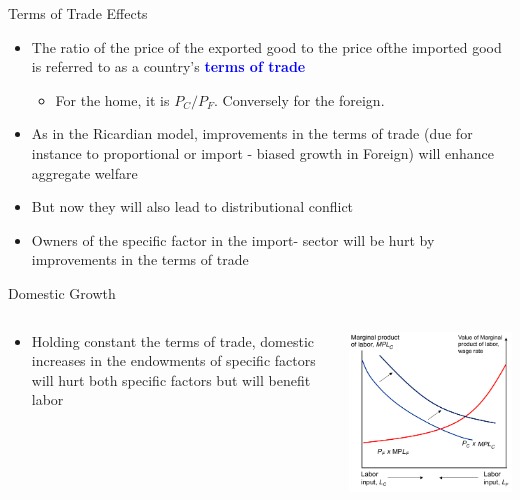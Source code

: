 \documentclass[10pt,hyperref={CJKbookmarks=true},xcolor=dvipsnames,aspectratio=169]{beamer}
\begin{document}
\begin{frame}{Terms of Trade Effects}

\begin{itemize}
\item The ratio of the price of the exported good to the price ofthe imported
good is referred to as a country's \textbf{\textcolor{blue}{terms
of trade}}

\begin{itemize}
\item For the home, it is $P_{C}/P_{F}$. Conversely for the foreign.
\end{itemize}
\item As in the Ricardian model, improvements in the terms of trade (due
for instance to proportional or import - biased growth in Foreign)
will enhance aggregate welfare 
\item But now they will also lead to distributional conflict 
\item Owners of the specific factor in the import- sector will be hurt by
improvements in the terms of trade 
\end{itemize}
\end{frame}

\begin{frame}{Domestic Growth}


\begin{columns}[onlytextwidth]
\begin{column}{0.4\textwidth}
\begin{itemize}
\item Holding constant the terms of trade, domestic increases in the endowments
of specific factors will hurt both specific factors but will benefit
labor
\end{itemize}

\end{column}
\begin{column}{0.6\textwidth}
\centering \includegraphics[width=0.8\columnwidth]{fig/sfm/lec4-23}
\end{column}
\end{columns}


\end{frame}
\end{document}
